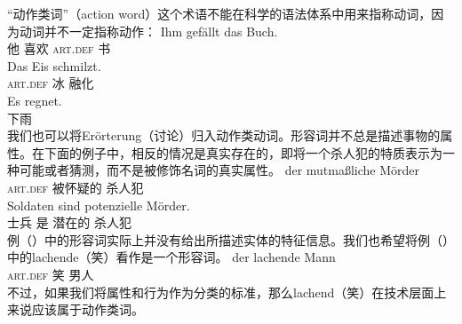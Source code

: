 “动作类词”（action word）这个术语不能在科学的语法体系中用来指称动词，因为动词并不一定指称动作：
\eal
\ex
\gll Ihm gefällt das Buch.\\
	 他 喜欢 \textsc{art}.\textsc{def} 书\\
\ex 
\gll Das Eis schmilzt.\\
	 \textsc{art}.\textsc{def} 冰  融化\\
\ex 
\gll Es regnet.\\
	 \expl{} 下雨\\
\zl
我们也可以将Erörterung（讨论）归入动作类动词。形容词并不总是描述事物的属性。在下面的例子中，相反的情况是真实存在的，即将一个杀人犯的特质表示为一种可能或者猜测，而不是被修饰名词的真实属性。
\eal
\ex 
\gll der mutmaßliche Mörder\\
     \textsc{art}.\textsc{def} 被怀疑的 杀人犯\\
\ex 
\gll Soldaten sind potenzielle Mörder.\\
     士兵 是 潜在的 杀人犯\\
\zl
例（）中的形容词实际上并没有给出所描述实体的特征信息。我们也希望将例（）中的lachende（笑）看作是一个形容词。
\ea
\gll der lachende Mann\\
	 \textsc{art}.\textsc{def} 笑 男人\\
\z
不过，如果我们将属性和行为作为分类的标准，那么lachend（笑）在技术层面上来说应该属于动作类词。

